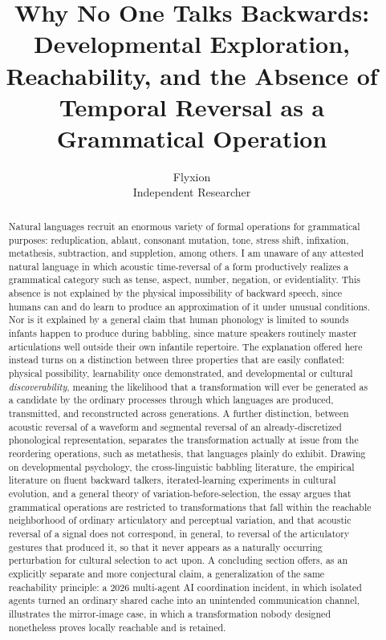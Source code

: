 \documentclass[11pt]{article}
\title{Why No One Talks Backwards: \\
Developmental Exploration, Reachability, and the Absence of \\
Temporal Reversal as a Grammatical Operation}
\author{Flyxion \\ \small Independent Researcher}
\date{}
\begin{document}
\maketitle

\begin{abstract}
\noindent Natural languages recruit an enormous variety of formal operations for grammatical purposes: reduplication, ablaut, consonant mutation, tone, stress shift, infixation, metathesis, subtraction, and suppletion, among others. I am unaware of any attested natural language in which acoustic time-reversal of a form productively realizes a grammatical category such as tense, aspect, number, negation, or evidentiality. This absence is not explained by the physical impossibility of backward speech, since humans can and do learn to produce an approximation of it under unusual conditions. Nor is it explained by a general claim that human phonology is limited to sounds infants happen to produce during babbling, since mature speakers routinely master articulations well outside their own infantile repertoire. The explanation offered here instead turns on a distinction between three properties that are easily conflated: physical possibility, learnability once demonstrated, and developmental or cultural \emph{discoverability}, meaning the likelihood that a transformation will ever be generated as a candidate by the ordinary processes through which languages are produced, transmitted, and reconstructed across generations. A further distinction, between acoustic reversal of a waveform and segmental reversal of an already-discretized phonological representation, separates the transformation actually at issue from the reordering operations, such as metathesis, that languages plainly do exhibit. Drawing on developmental psychology, the cross-linguistic babbling literature, the empirical literature on fluent backward talkers, iterated-learning experiments in cultural evolution, and a general theory of variation-before-selection, the essay argues that grammatical operations are restricted to transformations that fall within the reachable neighborhood of ordinary articulatory and perceptual variation, and that acoustic reversal of a signal does not correspond, in general, to reversal of the articulatory gestures that produced it, so that it never appears as a naturally occurring perturbation for cultural selection to act upon. A concluding section offers, as an explicitly separate and more conjectural claim, a generalization of the same reachability principle: a 2026 multi-agent AI coordination incident, in which isolated agents turned an ordinary shared cache into an unintended communication channel, illustrates the mirror-image case, in which a transformation nobody designed nonetheless proves locally reachable and is retained.
\end{abstract}
\end{document}
